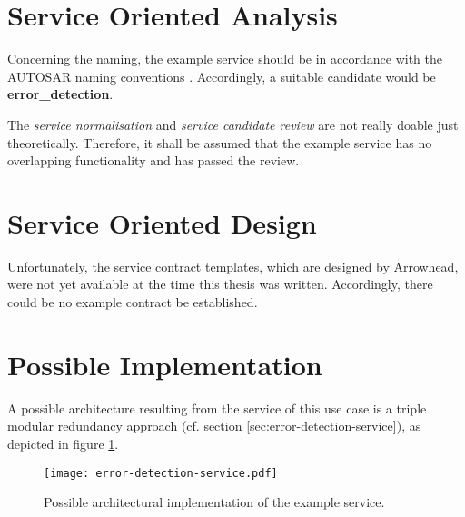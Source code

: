 \section{Service Oriented Analysis}


Concerning the naming, the example service should be in accordance with the \mbox{AUTOSAR} naming conventions \cite{autosar_system_modelling}. Accordingly, a suitable candidate would be \textbf{error\_detection}.

The \emph{service normalisation} and \emph{service candidate review} are not really doable just theoretically. Therefore, it shall be assumed that the example service has no overlapping functionality and has passed the review.





\section{Service Oriented Design}

Unfortunately, the service contract templates, which are designed by Arrowhead, were not yet available at the time this thesis was written. Accordingly, there could be no example contract be established.


\section{Possible Implementation}

A possible architecture resulting from the service of this use case is a triple modular redundancy approach (cf. section \ref{sec:error-detection-service}), as depicted in figure \ref{fig:example-service-architecture}. 


\begin{figure}[ht]
\centering
\texttt{[image: error-detection-service.pdf]}
\caption{Possible architectural implementation of the example service.}
\label{fig:example-service-architecture}
\end{figure}
